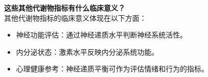 \documentclass[UTF8]{ctexart}
\begin{document}
\begin{tcolorbox}[
    enhanced,
    colback=lightpurple!10, %
    colframe=white,  %
    arc=3mm,
    boxrule=0.5pt,
    width=\textwidth,
    top=8pt,
    bottom=8pt
]
{\small{\color{lightpurple}\faQuestionCircle}\quad \textbf{这些其他代谢物指标有什么临床意义？}\\
{\color{orange!50}\faComments}\quad 其他代谢物指标的临床意义体现在以下方面：
\begin{itemize}
    \item 神经功能评估：通过神经递质水平判断神经系统活性。
    \item 内分泌状态：激素水平反映内分泌系统功能。
    \item 心理健康参考：神经递质平衡可作为评估情绪和行为的指标。
\end{itemize}
}
\end{tcolorbox}
\vspace{-0.5cm}
\end{document}
